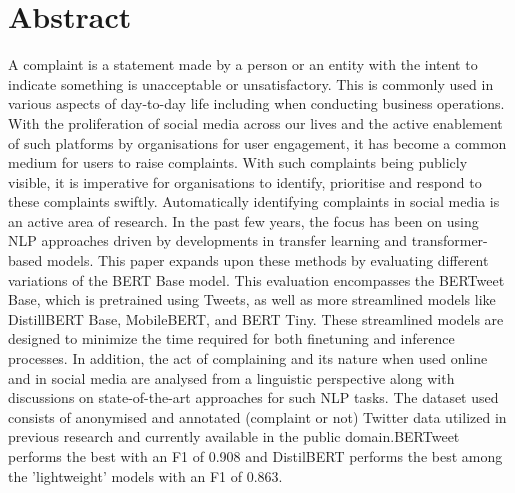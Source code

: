 \chapter*{\Large \center Abstract}

A complaint is a statement made by a person or an entity with the intent to indicate something is unacceptable or unsatisfactory. This is commonly used in various aspects of day-to-day life including when conducting business operations. With the proliferation of social media across our lives and the active enablement of such platforms by organisations for user engagement, it has become a common medium for users to raise complaints. With such complaints being publicly visible, it is imperative for organisations to identify, prioritise and respond to these complaints swiftly. Automatically identifying complaints in social media is an active area of research. In the past few years, the focus has been on using NLP approaches driven by developments in transfer learning and transformer-based models.
\newline \newline
This paper expands upon these methods by evaluating different variations of the BERT Base model. This evaluation encompasses the BERTweet Base, which is pretrained using Tweets, as well as more streamlined models like DistillBERT Base, MobileBERT, and BERT Tiny. These streamlined models are designed to minimize the time required for both finetuning and inference processes. In addition, the act of complaining and its nature when used online and in social media are analysed from a linguistic perspective along with discussions on state-of-the-art approaches for such NLP tasks. The dataset used consists of anonymised and annotated (complaint or not) Twitter data utilized in previous research and currently available in the public domain.BERTweet performs the best with an F1 of 0.908 and DistilBERT performs the best among the 'lightweight' models with an F1 of 0.863.
\newline \newline
